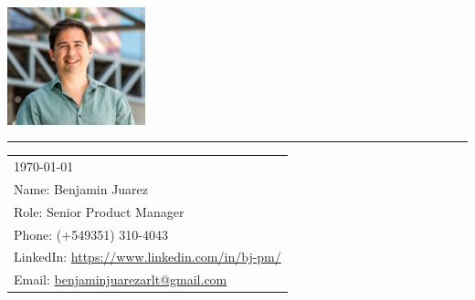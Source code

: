 
\includegraphics[width=0.3\textwidth]{pic.png} %

\vspace{-1em} %

\rule{\linewidth}{1pt} %

\bigskip\bigskip %


\hfill
\begin{tabular}{l @{}}
	\today \midskip\\ %
	Name: Benjamin Juarez \\
	Role: Senior Product Manager \\
	Phone: (+549351) 310-4043 \\
	LinkedIn: \href{https://www.linkedin.com/in/bj-pm/?locale=en_US}{https://www.linkedin.com/in/bj-pm/} \\
	Email: \href{benjaminjuarezarlt@gmail.com}{benjaminjuarezarlt@gmail.com} \\
\end{tabular}

\midskip 

